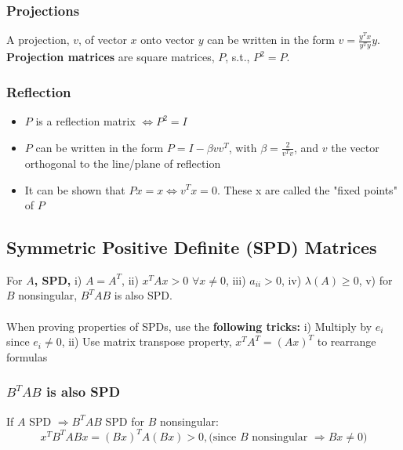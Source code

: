 \documentclass{article}
\begin{document}
\subsubsection{Projections}
A projection, $v$, of vector $x$ onto vector $y$ can be written in the form $v = \frac{y^Tx}{y^Ty}y$. \textbf{Projection matrices} are square matrices, $P$, s.t., $P^2 = P$. 

\subsubsection{Reflection}
\begin{itemize}
    \item $P$ is a reflection matrix $\Leftrightarrow P^2 = I$
    \item $P$ can be written in the form $P = I - \beta vv^T$, with $\beta = \frac{2}{v^Tv}$, and $v$ the vector orthogonal to the line/plane of reflection
    \item It can be shown that $Px = x \Leftrightarrow v^Tx = 0$. These x are called the "fixed points" of $P$
\end{itemize}

\subsection{Symmetric Positive Definite (SPD) Matrices}
For \textbf{$A$, SPD,} i) $A = A^T$, ii) $x^TAx > 0$  $\forall x \neq 0$, iii) $a_{ii} > 0$, iv) $\lambda(A) \geq 0$, v) for $B$ nonsingular, $B^TAB$ is also SPD.\\ \\
When proving properties of SPDs, use the \textbf{following tricks:} i) Multiply by $e_i$ since $e_i \neq 0$, ii) Use matrix transpose property, $x^TA^T = (Ax)^T$ to rearrange formulas

\subsubsection{$B^TAB$ is also SPD} 
If $A$ SPD $\Rightarrow B^TAB$ SPD for $B$ nonsingular:
\begin{equation*}
    x^TB^TABx = (Bx)^TA(Bx) > 0, \textrm{(since $B$ nonsingular $\Rightarrow Bx \neq 0$)}
\end{equation*}

\end{document}
